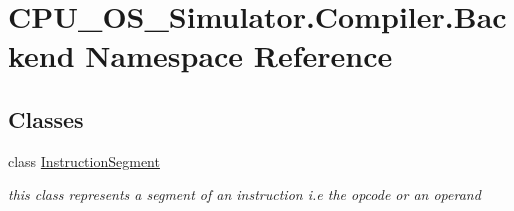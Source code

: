 \hypertarget{namespace_c_p_u___o_s___simulator_1_1_compiler_1_1_backend}{}\section{C\+P\+U\+\_\+\+O\+S\+\_\+\+Simulator.\+Compiler.\+Backend Namespace Reference}
\label{namespace_c_p_u___o_s___simulator_1_1_compiler_1_1_backend}
\subsection*{Classes}
\begin{DoxyCompactItemize}
\item 
class \hyperlink{class_c_p_u___o_s___simulator_1_1_compiler_1_1_backend_1_1_instruction_segment}{Instruction\+Segment}
\begin{DoxyCompactList}\small\item\em this class represents a segment of an instruction i.\+e the opcode or an operand \end{DoxyCompactList}\end{DoxyCompactItemize}
